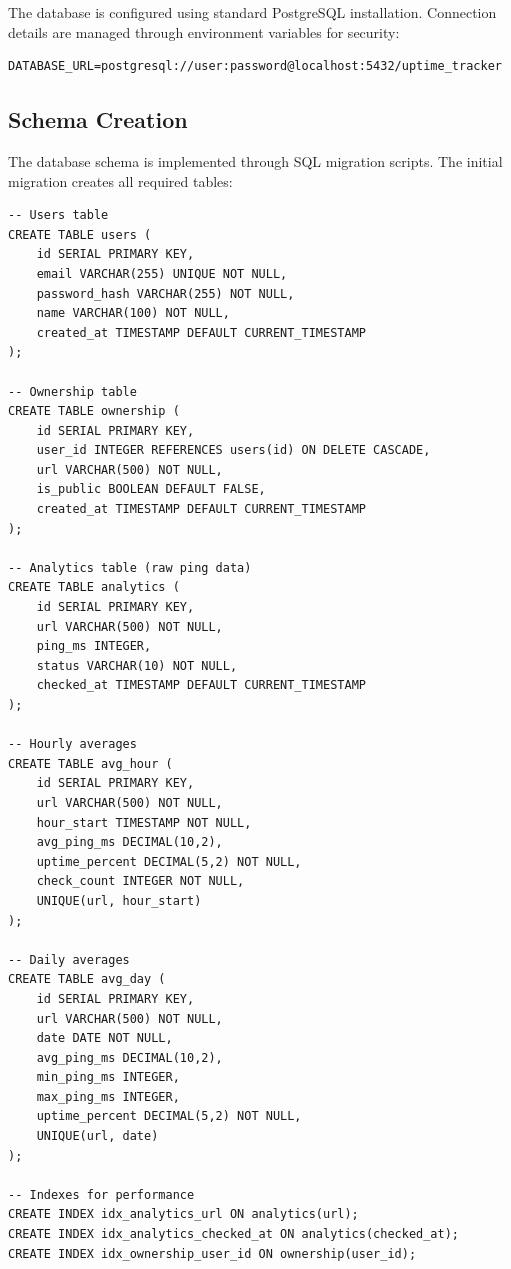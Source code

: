 The database is configured using standard PostgreSQL installation. Connection details are managed through environment variables for security:

\begin{verbatim}
DATABASE_URL=postgresql://user:password@localhost:5432/uptime_tracker
\end{verbatim}

\subsection{Schema Creation}

The database schema is implemented through SQL migration scripts. The initial migration creates all required tables:

\begin{verbatim}
-- Users table
CREATE TABLE users (
    id SERIAL PRIMARY KEY,
    email VARCHAR(255) UNIQUE NOT NULL,
    password_hash VARCHAR(255) NOT NULL,
    name VARCHAR(100) NOT NULL,
    created_at TIMESTAMP DEFAULT CURRENT_TIMESTAMP
);

-- Ownership table
CREATE TABLE ownership (
    id SERIAL PRIMARY KEY,
    user_id INTEGER REFERENCES users(id) ON DELETE CASCADE,
    url VARCHAR(500) NOT NULL,
    is_public BOOLEAN DEFAULT FALSE,
    created_at TIMESTAMP DEFAULT CURRENT_TIMESTAMP
);

-- Analytics table (raw ping data)
CREATE TABLE analytics (
    id SERIAL PRIMARY KEY,
    url VARCHAR(500) NOT NULL,
    ping_ms INTEGER,
    status VARCHAR(10) NOT NULL,
    checked_at TIMESTAMP DEFAULT CURRENT_TIMESTAMP
);

-- Hourly averages
CREATE TABLE avg_hour (
    id SERIAL PRIMARY KEY,
    url VARCHAR(500) NOT NULL,
    hour_start TIMESTAMP NOT NULL,
    avg_ping_ms DECIMAL(10,2),
    uptime_percent DECIMAL(5,2) NOT NULL,
    check_count INTEGER NOT NULL,
    UNIQUE(url, hour_start)
);

-- Daily averages
CREATE TABLE avg_day (
    id SERIAL PRIMARY KEY,
    url VARCHAR(500) NOT NULL,
    date DATE NOT NULL,
    avg_ping_ms DECIMAL(10,2),
    min_ping_ms INTEGER,
    max_ping_ms INTEGER,
    uptime_percent DECIMAL(5,2) NOT NULL,
    UNIQUE(url, date)
);

-- Indexes for performance
CREATE INDEX idx_analytics_url ON analytics(url);
CREATE INDEX idx_analytics_checked_at ON analytics(checked_at);
CREATE INDEX idx_ownership_user_id ON ownership(user_id);
\end{verbatim}

